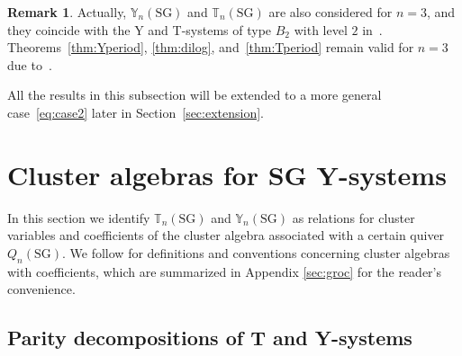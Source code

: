\documentclass[11pt]{article}
\numberwithin{equation}{section}
\theoremstyle{definition}
\newtheorem{Remark}[Theorem]{Remark}
\begin{document}
\begin{Remark}
Actually,
 $\mathbb{Y}_n(\mathrm{SG})$ and  $\mathbb{T}_n(\mathrm{SG})$
are also considered for $n=3$,
and they coincide with the Y and T-systems of
type $B_2$ with level $2$ in~\cite{Kuniba94a}.
Theorems~\ref{thm:Yperiod}, \ref{thm:dilog},
and~\ref{thm:Tperiod} remain valid for $n=3$
due to~\cite{Inoue10a}.
\end{Remark}

All the results in this subsection will be
extended to a more general case~\eqref{eq:case2}
later in Section~\ref{sec:extension}.

\setcounter{section}{2}
\setcounter{subsection}{3}
\setcounter{subsubsection}{0}
\setcounter{Theorem}{15}
\setcounter{equation}{20}
\section{Cluster algebras for SG Y-systems}
\label{sec:clusterSG}

In this section we identify $\mathbb{T}_{n}(\mathrm{SG})$ and
$\mathbb{Y}_{n}(\mathrm{SG})$ as relations for cluster variables
and coef\/f\/icients of the cluster algebra
associated with a certain quiver $Q_{n}(\mathrm{SG})$.
We follow \cite{Fomin07}
 for def\/initions and conventions concerning cluster algebras
with coef\/f\/icients,
which are summarized in Appendix \ref{sec:groc} for the reader's
convenience.

\subsection{Parity decompositions of T and Y-systems}
\end{document}
